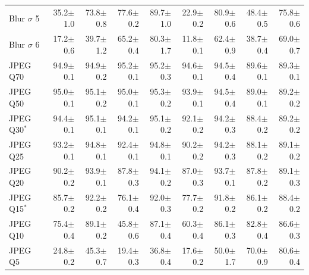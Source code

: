 \begin{table}[H]
\begin{tabular}{lrrrrrrrr}
Blur $\sigma$ 5 & 35.2{\scriptsize$\pm$1.0} & 73.8{\scriptsize$\pm$0.8} & 77.6{\scriptsize$\pm$0.2} & 89.7{\scriptsize$\pm$1.0} & 22.9{\scriptsize$\pm$0.2} & 80.9{\scriptsize$\pm$0.6} & 48.4{\scriptsize$\pm$0.5} & 75.8{\scriptsize$\pm$0.6} \\
Blur $\sigma$ 6 & 17.2{\scriptsize$\pm$0.6} & 39.7{\scriptsize$\pm$1.2} & 65.2{\scriptsize$\pm$0.4} & 80.3{\scriptsize$\pm$1.7} & 11.8{\scriptsize$\pm$0.1} & 62.4{\scriptsize$\pm$0.9} & 38.7{\scriptsize$\pm$0.4} & 69.0{\scriptsize$\pm$0.7} \\
\addlinespace
JPEG Q70 & 94.9{\scriptsize$\pm$0.1} & 94.9{\scriptsize$\pm$0.2} & 95.2{\scriptsize$\pm$0.1} & 95.2{\scriptsize$\pm$0.3} & 94.6{\scriptsize$\pm$0.1} & 94.5{\scriptsize$\pm$0.4} & 89.6{\scriptsize$\pm$0.1} & 89.3{\scriptsize$\pm$0.1} \\
JPEG Q50 & 95.0{\scriptsize$\pm$0.1} & 95.1{\scriptsize$\pm$0.2} & 95.0{\scriptsize$\pm$0.1} & 95.3{\scriptsize$\pm$0.2} & 93.9{\scriptsize$\pm$0.1} & 94.5{\scriptsize$\pm$0.4} & 89.0{\scriptsize$\pm$0.1} & 89.2{\scriptsize$\pm$0.2} \\
JPEG Q30$^{*}$ & 94.4{\scriptsize$\pm$0.1} & 95.1{\scriptsize$\pm$0.1} & 94.2{\scriptsize$\pm$0.1} & 95.1{\scriptsize$\pm$0.2} & 92.1{\scriptsize$\pm$0.2} & 94.2{\scriptsize$\pm$0.3} & 88.4{\scriptsize$\pm$0.2} & 89.2{\scriptsize$\pm$0.2} \\
JPEG Q25 & 93.2{\scriptsize$\pm$0.1} & 94.8{\scriptsize$\pm$0.1} & 92.4{\scriptsize$\pm$0.1} & 94.8{\scriptsize$\pm$0.1} & 90.2{\scriptsize$\pm$0.2} & 94.2{\scriptsize$\pm$0.3} & 88.1{\scriptsize$\pm$0.2} & 89.1{\scriptsize$\pm$0.2} \\
JPEG Q20 & 90.2{\scriptsize$\pm$0.2} & 93.9{\scriptsize$\pm$0.1} & 87.8{\scriptsize$\pm$0.3} & 94.1{\scriptsize$\pm$0.2} & 87.0{\scriptsize$\pm$0.3} & 93.7{\scriptsize$\pm$0.1} & 87.8{\scriptsize$\pm$0.2} & 89.1{\scriptsize$\pm$0.3} \\
JPEG Q15$^{*}$ & 85.7{\scriptsize$\pm$0.2} & 92.2{\scriptsize$\pm$0.2} & 76.1{\scriptsize$\pm$0.4} & 92.0{\scriptsize$\pm$0.3} & 77.7{\scriptsize$\pm$0.2} & 91.8{\scriptsize$\pm$0.2} & 86.1{\scriptsize$\pm$0.2} & 88.4{\scriptsize$\pm$0.2} \\
JPEG Q10 & 75.4{\scriptsize$\pm$0.4} & 89.1{\scriptsize$\pm$0.2} & 45.8{\scriptsize$\pm$0.6} & 87.1{\scriptsize$\pm$0.4} & 60.3{\scriptsize$\pm$0.4} & 86.1{\scriptsize$\pm$0.3} & 82.8{\scriptsize$\pm$0.4} & 86.6{\scriptsize$\pm$0.3} \\
JPEG Q5 & 24.8{\scriptsize$\pm$0.2} & 45.3{\scriptsize$\pm$0.7} & 19.4{\scriptsize$\pm$0.3} & 36.8{\scriptsize$\pm$0.4} & 17.6{\scriptsize$\pm$0.2} & 50.0{\scriptsize$\pm$1.7} & 70.0{\scriptsize$\pm$0.9} & 80.6{\scriptsize$\pm$0.4} \\

\end{tabular}
\end{table}
